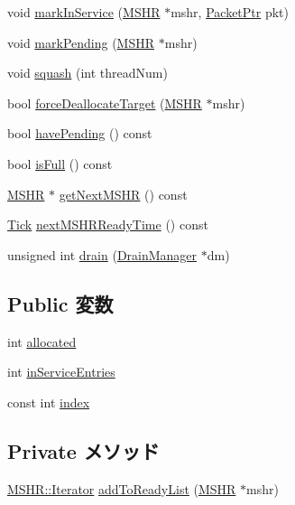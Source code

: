 \begin{DoxyCompactItemize}
\item 
void \hyperlink{classMSHRQueue_a1131b37f2a7bef3428b45951455cfcad}{markInService} (\hyperlink{classMSHR}{MSHR} $\ast$mshr, \hyperlink{classPacket}{PacketPtr} pkt)
\item 
void \hyperlink{classMSHRQueue_ab0f258b25fe50dc16d5e3e5890214c5c}{markPending} (\hyperlink{classMSHR}{MSHR} $\ast$mshr)
\item 
void \hyperlink{classMSHRQueue_a94c2c174856cbab1e3478cb02ae8ed80}{squash} (int threadNum)
\item 
bool \hyperlink{classMSHRQueue_acda43ebd9ff1813951d7d0ab3eaad05c}{forceDeallocateTarget} (\hyperlink{classMSHR}{MSHR} $\ast$mshr)
\item 
bool \hyperlink{classMSHRQueue_aef5fae0b3798035ac6f7ad1ab9038aca}{havePending} () const 
\item 
bool \hyperlink{classMSHRQueue_a7ffe8a6212a0eb3fc7bbc8e9bc51dfcd}{isFull} () const 
\item 
\hyperlink{classMSHR}{MSHR} $\ast$ \hyperlink{classMSHRQueue_a98b9ba341284c5251a7908cd45918066}{getNextMSHR} () const 
\item 
\hyperlink{base_2types_8hh_a5c8ed81b7d238c9083e1037ba6d61643}{Tick} \hyperlink{classMSHRQueue_a4601a57ba7740776052541f212c29cbd}{nextMSHRReadyTime} () const 
\item 
unsigned int \hyperlink{classMSHRQueue_aa8a18d230dba7a674ac8a0b4f35bc36a}{drain} (\hyperlink{classDrainManager}{DrainManager} $\ast$dm)
\end{DoxyCompactItemize}
\subsection*{Public 変数}
\begin{DoxyCompactItemize}
\item 
int \hyperlink{classMSHRQueue_a115235fc25fdf1c03d856bd072b6cead}{allocated}
\item 
int \hyperlink{classMSHRQueue_aa4871243af391ed1f0d5e3f964bc13d0}{inServiceEntries}
\item 
const int \hyperlink{classMSHRQueue_a32b76ccceab9e1bba3e8c4ef2947d1d8}{index}
\end{DoxyCompactItemize}
\subsection*{Private メソッド}
\begin{DoxyCompactItemize}
\item 
\hyperlink{classMSHR_af944263ff3027ab76cf07354d3a3f0c6}{MSHR::Iterator} \hyperlink{classMSHRQueue_a80c2dad36455852eae13562756599fa4}{addToReadyList} (\hyperlink{classMSHR}{MSHR} $\ast$mshr)
\end{DoxyCompactItemize}
